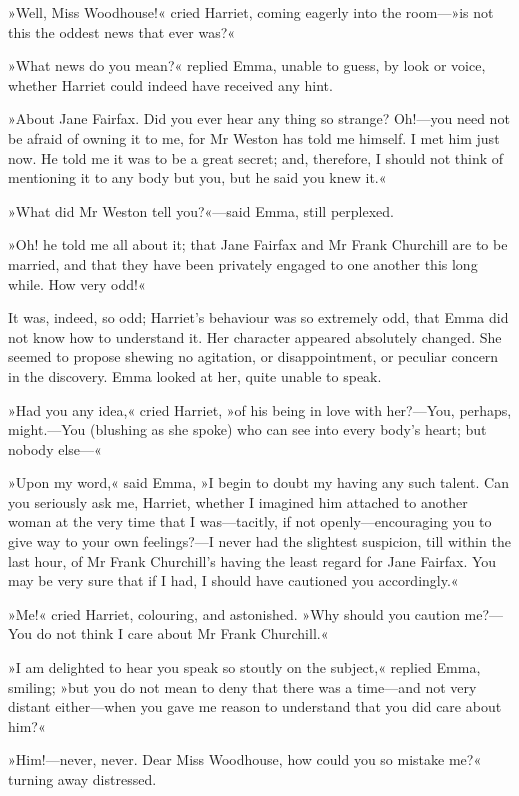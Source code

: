 »Well, Miss Woodhouse!« cried Harriet, coming eagerly into the room—»is not this the oddest news that ever was?«

»What news do you mean?« replied Emma, unable to guess, by look or voice, whether Harriet could indeed have received any hint.

»About Jane Fairfax. Did you ever hear any thing so strange? Oh!—you need not be afraid of owning it to me, for Mr Weston has told me himself. I met him just now. He told me it was to be a great secret; and, therefore, I should not think of mentioning it to any body but you, but he said you knew it.«

»What did Mr Weston tell you?«—said Emma, still perplexed.

»Oh! he told me all about it; that Jane Fairfax and Mr Frank Churchill are to be married, and that they have been privately engaged to one another this long while. How very odd!«

It was, indeed, so odd; Harriet's behaviour was so extremely odd, that Emma did not know how to understand it. Her character appeared absolutely changed. She seemed to propose shewing no agitation, or disappointment, or peculiar concern in the discovery. Emma looked at her, quite unable to speak.

»Had you any idea,« cried Harriet, »of his being in love with her?—You, perhaps, might.—You (blushing as she spoke) who can see into every body's heart; but nobody else—«

»Upon my word,« said Emma, »I begin to doubt my having any such talent. Can you seriously ask me, Harriet, whether I imagined him attached to another woman at the very time that I was—tacitly, if not openly—encouraging you to give way to your own feelings?—I never had the slightest suspicion, till within the last hour, of Mr Frank Churchill's having the least regard for Jane Fairfax. You may be very sure that if I had, I should have cautioned you accordingly.«

»Me!« cried Harriet, colouring, and astonished. »Why should you caution me?—You do not think I care about Mr Frank Churchill.«

»I am delighted to hear you speak so stoutly on the subject,« replied Emma, smiling; »but you do not mean to deny that there was a time—and not very distant either—when you gave me reason to understand that you did care about him?«

»Him!—never, never. Dear Miss Woodhouse, how could you so mistake me?« turning away distressed.

